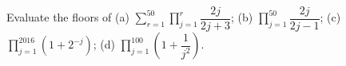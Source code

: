 Evaluate the floors of (a) $\sum_{r=1}^{50}\prod_{j=1}^r\dfrac{2j}{2j+3}$; (b) $\prod_{j=1}^{50}\dfrac{2j}{2j-1}$; (c) $\prod_{j=1}^{2016}(1+2^{-j})$; (d) $\prod_{j=1}^{100}\left(1+\dfrac{1}{j^2}\right)$.
